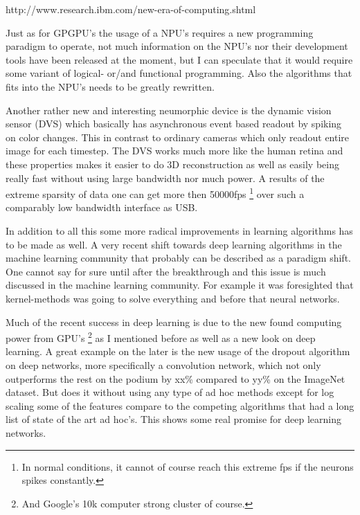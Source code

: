 \documentclass{article}
\begin{document}
    http://www.research.ibm.com/new-era-of-computing.shtml 

    Just as for GPGPU's the usage of a NPU's requires a new programming 
    paradigm to operate, not much information on the NPU's nor their 
    development tools have been released at the moment, but I can speculate 
    that it would require some variant of logical- or/and functional 
    programming. Also the algorithms that fits into the NPU's needs to be 
    greatly rewritten.
    
    Another rather new and interesting neumorphic device is the
    dynamic vision sensor (DVS) which basically has asynchronous event based
    readout by spiking on color changes.\cite{dvs} This in contrast to ordinary
    cameras which only readout entire image for each timestep. 
    The DVS works much more like the human retina and
    these properties makes it easier to do 3D reconstruction as well as easily
    being really fast without using large bandwidth nor much power. A results
    of the extreme sparsity of data one can get more then 50000fps
    \footnote{In normal conditions, it cannot of course reach this extreme fps
    if the neurons spikes constantly.}
    over such a comparably low bandwidth interface as USB.

    In addition to all this some more radical improvements in learning
    algorithms has to be made as well. A very recent shift towards deep
    learning algorithms in the machine learning community that probably can be
    described as a paradigm shift. One cannot say for sure until after the
    breakthrough and this issue is much discussed in the machine learning
    community. For example it was foresighted that kernel-methods was going to
    solve everything and before that neural networks.
   
    Much of the recent success in deep learning is due to the new found 
    computing power from GPU's
    \footnote{And Google's 10k computer strong cluster of course.} 
    as I mentioned before as well as a new look on deep learning. A great 
    example on the later is the new usage of the dropout algorithm on deep 
    networks, more specifically a convolution network, which not only 
    outperforms the rest on the podium by xx\% compared to yy\% on the ImageNet 
    dataset.\cite{imagenet}
    But does it without using any type of ad hoc methods except for log scaling 
    some of the features compare to the competing algorithms that had a long 
    list of state of the art ad hoc's.\cite{dropout} This shows some real 
    promise for deep learning networks.
\end{document}
